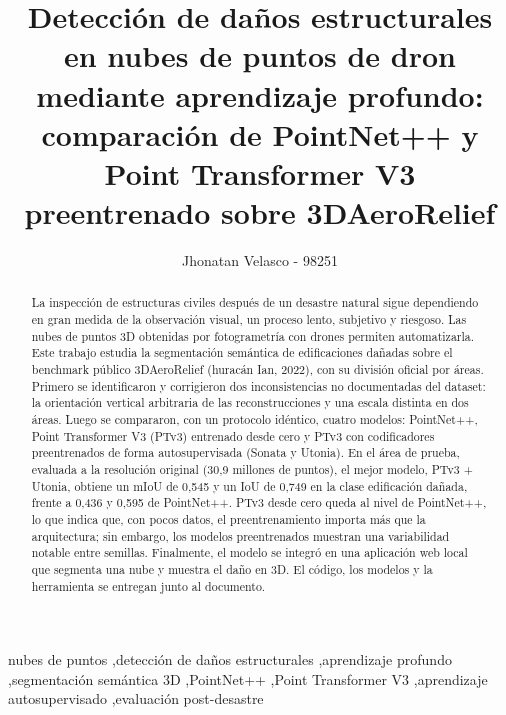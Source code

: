\documentclass[5p]{elsarticle}
\begin{document}
\begin{frontmatter}

\title{Detección de daños estructurales en nubes de puntos de dron mediante aprendizaje profundo: comparación de PointNet++ y Point Transformer V3 preentrenado sobre 3DAeroRelief}

\author{Jhonatan Velasco - 98251}


\begin{abstract}
La inspección de estructuras civiles después de un desastre natural sigue dependiendo en gran medida de la observación visual, un proceso lento, subjetivo y riesgoso. Las nubes de puntos 3D obtenidas por fotogrametría con drones permiten automatizarla. Este trabajo estudia la segmentación semántica de edificaciones dañadas sobre el benchmark público 3DAeroRelief (huracán Ian, 2022), con su división oficial por áreas. Primero se identificaron y corrigieron dos inconsistencias no documentadas del dataset: la orientación vertical arbitraria de las reconstrucciones y una escala distinta en dos áreas. Luego se compararon, con un protocolo idéntico, cuatro modelos: PointNet++, Point Transformer V3 (PTv3) entrenado desde cero y PTv3 con codificadores preentrenados de forma autosupervisada (Sonata y Utonia). En el área de prueba, evaluada a la resolución original (30,9 millones de puntos), el mejor modelo, PTv3 + Utonia, obtiene un mIoU de 0,545 y un IoU de 0,749 en la clase edificación dañada, frente a 0,436 y 0,595 de PointNet++. PTv3 desde cero queda al nivel de PointNet++, lo que indica que, con pocos datos, el preentrenamiento importa más que la arquitectura; sin embargo, los modelos preentrenados muestran una variabilidad notable entre semillas. Finalmente, el modelo se integró en una aplicación web local que segmenta una nube y muestra el daño en 3D. El código, los modelos y la herramienta se entregan junto al documento.
\end{abstract}

\begin{keyword}
nubes de puntos \sep detección de daños estructurales \sep aprendizaje profundo \sep segmentación semántica 3D \sep PointNet++ \sep Point Transformer V3 \sep aprendizaje autosupervisado \sep evaluación post-desastre
\end{keyword}

\end{frontmatter}
\end{document}
